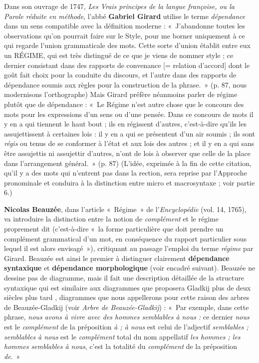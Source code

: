 {    Dans son ouvrage de 1747, \textit{Les Vrais principes de la langue françoise, ou la Parole réduite en méthode}, l’abbé \textbf{Gabriel Girard} utilise le terme \textit{dépendance} dans un sens compatible avec la définition moderne : «~J’abandonne toutes les observations qu’on pourrait faire sur le Style, pour me borner uniquement à ce qui regarde l’union grammaticale des mots. Cette sorte d’union établit entre eux un RÉGIME, qui est très distingué de ce que je viens de nommer style ; ce dernier consistant dans des rapports de convenance [= relation d’accord] dont le goût fait choix pour la conduite du discours, et l’autre dans des rapports de dépendance soumis aux règles pour la construction de la phrase.~» (p. 87, nous modernisons l’orthographe) Mais Girard préfère néanmoins parler de régime plutôt que de dépendance : «~Le Régime n’est autre chose que le concours des mots pour les expressions d’un sens ou d’une pensée. Dans ce concours de mots il y en a qui tiennent le haut bout ; ils en régissent d’autres, c’est-à-dire qu’ils les assujettissent à certaines lois : il y en a qui se présentent d’un air soumis ; ils sont \textit{régis} ou tenus de se conformer à l’état et aux lois des autres ; et il y en a qui sans être assujettis ni assujettir d’autres, n’ont de lois à observer que celle de la place dans l’arrangement général.~» (p. 87) (L’idée, exprimée à la fin de cette citation, qu’il y a des mots qui n’entrent pas dans la rection, sera reprise par l’Approche pronominale et conduira à la distinction entre micro et macrosyntaxe ; voir partie 6.)

    \textbf{Nicolas Beauzée}, dans l’article «~Régime~» de l’\textit{Encyclopédie} (vol. 14, 1765), va introduire la distinction entre la notion de \textit{complément} et le régime proprement dit (c’est-à-dire «~la forme particulière que doit prendre un complément grammatical d’un mot, en conséquence du rapport particulier sous lequel il est alors envisagé~»), critiquant au passage l’emploi du terme \textit{régime} par Girard. Beauzée est ainsi le premier à distinguer clairement \textbf{dépendance syntaxique} et \textbf{dépendance morphologique} (voir encadré suivant). Beauzée ne dessine pas de diagramme, mais il fait une description détaillée de la structure syntaxique qui est similaire aux diagrammes que proposera Gladkij plus de deux siècles plus tard , diagrammes que nous appellerons pour cette raison des arbres de Beauzée-Gladkij (voir  \textit{Arbre de Beauzée-Gladkij}) : «~Par exemple, dans cette phrase, \textit{nous avons à vivre avec des hommes semblables à nous :} ce dernier \textit{nous} est le \textit{complément} de la préposition \textit{à ; à nous} est celui de l’adjectif \textit{semblables ; semblables à nous} est le \textit{complément} total du nom appellatif \textit{les hommes ; les hommes semblables à nous}, c’est la totalité du \textit{complément} de la préposition \textit{de}.~»

}
